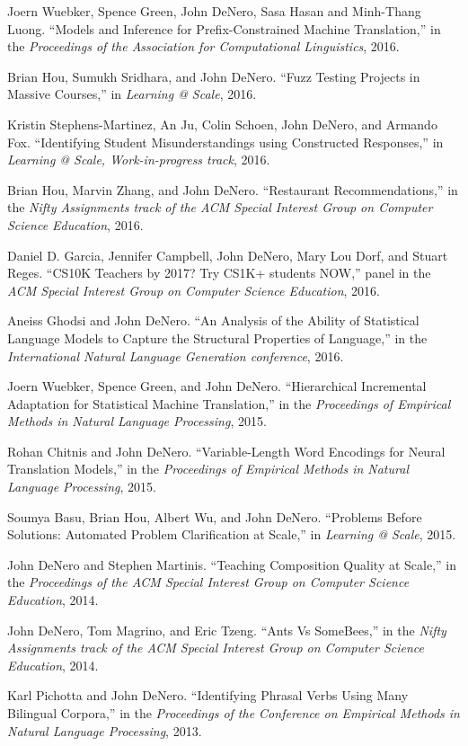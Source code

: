 \documentclass[margin,line]{res}
\begin{document}
\begin{resume}
Joern Wuebker, Spence Green, John DeNero, Sasa Hasan and Minh-Thang Luong. ``Models and Inference for Prefix-Constrained Machine Translation,'' in the {\it Proceedings of the Association for Computational Linguistics}, 2016.

Brian Hou, Sumukh Sridhara, and John DeNero. ``Fuzz Testing Projects in Massive Courses,'' in {\it Learning @ Scale}, 2016.

Kristin Stephens-Martinez, An Ju, Colin Schoen, John DeNero, and Armando Fox. ``Identifying Student Misunderstandings using Constructed Responses,'' in {\it Learning @ Scale, Work-in-progress track}, 2016.

Brian Hou, Marvin Zhang, and John DeNero. ``Restaurant Recommendations,'' in the {\it Nifty Assignments track of the ACM Special Interest Group on Computer Science Education}, 2016.

Daniel D. Garcia, Jennifer Campbell, John DeNero, Mary Lou Dorf, and Stuart Reges. ``CS10K Teachers by 2017?  Try CS1K+ students NOW,'' panel in the {\it ACM Special Interest Group on Computer Science Education}, 2016.

Aneiss Ghodsi and John DeNero. ``An Analysis of the Ability of Statistical Language Models to Capture the Structural Properties of Language,'' in the {\it International Natural Language Generation conference}, 2016.

Joern Wuebker, Spence Green, and John DeNero. ``Hierarchical Incremental Adaptation for Statistical Machine Translation,'' in the {\it Proceedings of Empirical Methods in Natural Language Processing}, 2015.

Rohan Chitnis and John DeNero. ``Variable-Length Word Encodings for Neural Translation Models,'' in the {\it Proceedings of Empirical Methods in Natural Language Processing}, 2015.

Soumya Basu, Brian Hou, Albert Wu, and John DeNero. ``Problems Before Solutions: Automated Problem Clarification at Scale,'' in {\it Learning @ Scale}, 2015.

John DeNero and Stephen Martinis.  ``Teaching Composition Quality at Scale,'' in the {\it Proceedings of the ACM Special Interest Group on Computer Science Education}, 2014.

John DeNero, Tom Magrino, and Eric Tzeng.  ``Ants Vs SomeBees,'' in the {\it Nifty Assignments track of the ACM Special Interest Group on Computer Science Education}, 2014.

Karl Pichotta and John DeNero.  ``Identifying Phrasal Verbs Using Many Bilingual Corpora,'' in the {\it Proceedings of the Conference on Empirical Methods in Natural Language Processing}, 2013.


\end{resume}
\end{document}
